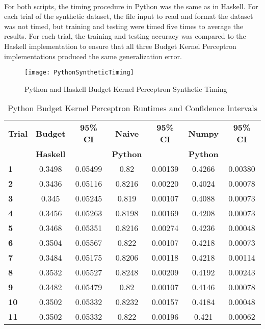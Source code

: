 \\For both scripts, the timing procedure in Python was the same as in Haskell. For each trial of the synthetic dataset, the file input to read and format the dataset was not timed, but training and testing were timed five times to average the results. For each trial, the training and testing accuracy was compared to the Haskell implementation to ensure that all three Budget Kernel Perceptron implementations produced the same generalization error.

\begin{figure}[p]
 \caption{Python and Haskell Budget Kernel Perceptron Synthetic Timing}
 \label{SyntheticPythonHaskellTiming}
 \texttt{[image: PythonSyntheticTiming]}
\end{figure}

\begin{table}[p]
 \begin{center}
  \caption{Python Budget Kernel Perceptron Runtimes and Confidence Intervals}
  \label{tab:pythontiming}
  \begin{tabular}{l|c|c|c|c|c|c}
  \textbf{Trial} & \textbf{Budget} & \textbf{95\% CI} & \textbf{Naive} & \textbf{95\% CI} & \textbf{Numpy} & \textbf{95\% CI}\\
  \textbf{} & \textbf{Haskell} & \textbf{} & \textbf{Python} & \textbf{} & \textbf{Python}\\
  \hline
  \textbf{1} & 0.3498 & 0.05499 & 0.82 & 0.00139 & 0.4266 & 0.00380\\
  \textbf{2} & 0.3436 & 0.05116 & 0.8216 & 0.00220 & 0.4024 & 0.00078\\
  \textbf{3} & 0.345 & 0.05245 & 0.819 & 0.00107 & 0.4088 & 0.00073\\
  \textbf{4} & 0.3456 & 0.05263 & 0.8198 & 0.00169 & 0.4208 & 0.00073\\
  \textbf{5} & 0.3468 & 0.05351 & 0.8216 & 0.00274 & 0.4236 & 0.00048\\
  \textbf{6} & 0.3504 & 0.05567 & 0.822 & 0.00107 & 0.4218 & 0.00073\\
  \textbf{7} & 0.3484 & 0.05175 & 0.8206 & 0.00118 & 0.4218 & 0.00114\\
  \textbf{8} & 0.3532 & 0.05527 & 0.8248 & 0.00209 & 0.4192 & 0.00243\\
  \textbf{9} & 0.3482 & 0.05479 & 0.82 & 0.00107 & 0.4146 & 0.00078\\
  \textbf{10} & 0.3502 & 0.05332 & 0.8232 & 0.00157 & 0.4184 & 0.00048\\
  \textbf{11} & 0.3502 & 0.05332 & 0.822 & 0.00196 & 0.421 & 0.00062\\

\end{tabular}
\end{center}
\end{table}
